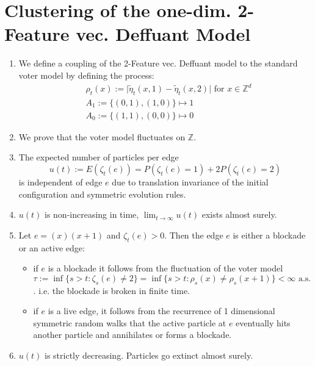\documentclass[
paper=128mm:96mm, %
fontsize=11pt, %
pagesize, %
parskip=half-, %
]{scrartcl} %
\theoremstyle{mythmstyle} %
\begin{document}
\section{Clustering of the one-dim. 2-Feature vec. Deffuant Model}


\begin{enumerate}
\item We define a coupling of the 2-Feature vec. Deffuant model to the standard voter model by defining the process:
\begin{equation}
\begin{split}
&\rho_t(x) :=  \vert \tilde{\eta}_{t}(x,1)-\tilde{\eta}_{t}(x,2) \vert \text{ for } x \in \mathbb{Z}^d  \\
&A_1 := \{(0,1),(1,0)\} \longmapsto 1 \\
&A_0 := \{(1,1),(0,0)\} \longmapsto 0
\end{split}
\end{equation}
\item We prove that the voter model fluctuates on $\mathbb{Z}$.
\item The expected number of particles per edge
$$ u(t) := E(\zeta_t(e)) = P(\zeta_t(e)=1)+2P(\zeta_t(e)=2)$$
is independent of edge $e$ due to translation invariance of the initial configuration and symmetric evolution rules.
\item $u(t)$ is non-increasing in time, $\lim_{t \rightarrow \infty} u(t)$ exists almost surely.
\item Let $e=(x)(x+1)$ and $\zeta_t(e)>0$. Then the edge $e$ is either a blockade or an active edge:
\begin{itemize}
\item if $e$ is a blockade it follows from the fluctuation of the voter model $ \tau := \inf \{ s>t: \zeta_s(e) \neq 2 \} = \inf \{ s>t: \rho_s(x) \neq \rho_s(x+1) \} < \infty \text{ a.s.} $. i.e. the blockade is broken in finite time.
\item if $e$ is a live edge, it follows from the recurrence of 1 dimensional symmetric random walks that the active particle at $e$ eventually hits another particle and annihilates or forms a blockade.
\end{itemize}
\item $u(t)$ is strictly decreasing. Particles go extinct almost surely. 

\end{enumerate}
\end{document}
